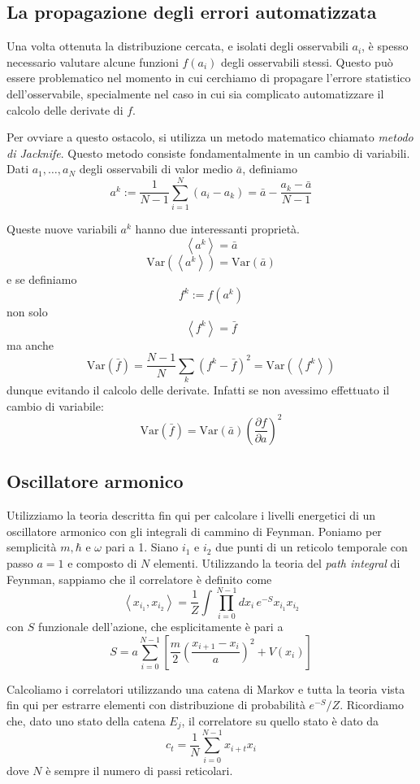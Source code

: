 \documentclass[a4paper,10pt]{article}
\begin{document}
\subsection{La propagazione degli errori automatizzata}
Una volta ottenuta la distribuzione cercata, e isolati degli osservabili $a_i$, è spesso necessario valutare alcune funzioni $f(a_i)$ degli osservabili stessi. Questo può essere problematico nel momento in cui cerchiamo di propagare l'errore statistico dell'osservabile, specialmente nel caso in cui sia complicato automatizzare il calcolo delle derivate di $f$.

Per ovviare a questo ostacolo, si utilizza un metodo matematico chiamato \emph{metodo di Jacknife}.
Questo metodo consiste fondamentalmente in un cambio di variabili. Dati $a_1,\dots,a_N$ degli osservabili di valor medio $\bar{a}$, definiamo
$$a^k := \frac{1}{N-1}\sum_{i=1}^N(a_i-a_k) = \bar{a}-\frac{a_k-\bar{a}}{N-1}$$

Queste nuove variabili $a^k$ hanno due interessanti proprietà.
$$\left<a^k\right> = \bar{a} $$
$$\text{Var}(\left<a^k\right>) = \text{Var}(\bar{a}) $$
e se definiamo
$$f^k:=f(a^k)$$
non solo
$$\left<f^k\right> = \bar{f}$$
ma anche
$$\text{Var}(\bar{f}) = \frac{N-1}{N} \sum_k (f^k-\bar{f})^2 = \text{Var}(\left<f^k\right>)$$
dunque evitando il calcolo delle derivate. Infatti se non avessimo effettuato il cambio di variabile:
$$\text{Var}(\bar{f}) = \text{Var}(\bar{a})\left(\frac{\partial f}{\partial a}\right)^2 $$

\subsection{Oscillatore armonico}
Utilizziamo la teoria descritta fin qui per calcolare i livelli energetici di un oscillatore armonico con gli integrali di cammino di Feynman. Poniamo per semplicità $m, \hbar$ e $\omega$ pari a 1.
Siano $i_1$ e $i_2$ due punti di un reticolo temporale con passo $a=1$ e composto di $N$ elementi.
Utilizzando la teoria del \emph{path integral} di Feynman, sappiamo che il correlatore è definito come
$$ \left<x_{i_1},x_{i_2}\right> = \frac{1}{Z}\int\prod_{i=0}^{N-1}dx_i\,e^{-S}x_{i_1}x_{i_2} $$
con $S$ funzionale dell'azione, che esplicitamente è pari a
$$ S = a\sum_{i=0}^{N-1} \left[ \frac{m}{2} \left( \frac{x_{i+1}-x_i}{a} \right)^2+V(x_i)\right]$$

Calcoliamo i correlatori utilizzando una catena di Markov e tutta la teoria vista fin qui per estrarre elementi con distribuzione di probabilità $e^{-S}/Z$. Ricordiamo che, dato uno stato della catena $E_j$, il correlatore su quello stato è dato da
$$c_t=\frac{1}{N}\sum_{i=0}^{N-1}x_{i+t}x_i$$
dove $N$ è sempre il numero di passi reticolari.
\end{document}
